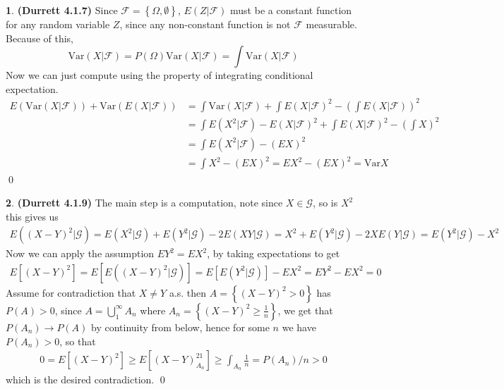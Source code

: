 \documentclass{article}
\theoremstyle{definition}
\newtheorem{pb}{}
\newcommand{\set}[1]{\left\{#1\right\}}
\newcommand{\var}{\text{Var}}
\begin{document}
    \begin{pb}\textbf{(Durrett 4.1.7)}
        Since \(\mathcal{F} = \set{\Omega,\emptyset}\), \(E(Z|\mathcal{F})\) must be a constant function for any random variable \(Z\), since any non-constant function is not \(\mathcal{F}\) measurable. Because of this, \[\var(X|\mathcal{F}) = P(\Omega)\var(X|\mathcal{F}) = \int \var(X|\mathcal{F})\] Now we can just compute using the property of integrating conditional expectation.
        \begin{align*}
            E(\var(X|\mathcal{F})) + \var(E(X|\mathcal{F})) &= \int \var(X|\mathcal{F}) + \int E(X|\mathcal{F})^2 - \left(\int E(X|\mathcal{F})\right)^2 \\
            &= \int E(X^2|\mathcal{F}) - E(X|\mathcal{F})^2 + \int E(X|\mathcal{F})^2 - \left(\int X\right)^2 \\
            &= \int E(X^2|\mathcal{F}) - (EX)^2 \\
            &= \int X^2 - (EX)^2 = EX^2 - (EX)^2 = \var X
        \end{align*} \qed
    \end{pb}
    \begin{pb}\textbf{(Durrett 4.1.9)}
        The main step is a computation, note since \(X\in \mathcal{G}\), so is \(X^2\) this gives us
        \begin{align*}
            E((X-Y)^2|\mathcal{G}) = E(X^2|\mathcal{G}) + E(Y^2|\mathcal{G}) - 2E(XY|\mathcal{G}) = X^2 + E(Y^2|\mathcal{G}) - 2XE(Y|\mathcal{G}) = E(Y^2|\mathcal{G}) - X^2
        \end{align*}
        Now we can apply the assumption \(EY^2 = EX^2\), by taking expectations to get
        \begin{align*}
            E[(X-Y)^2] = E[E((X-Y)^2|\mathcal{G})] = E[E(Y^2|\mathcal{G})] - EX^2 = EY^2 - EX^2 = 0
        \end{align*}
        Assume for contradiction that \(X \neq Y\) a.s. then \(A = \set{(X-Y)^2 > 0}\) has \(P(A) > 0\), since \(A = \bigcup_{1}^\infty A_n\) where \(A_n = \set{(X-Y)^2 \geq \frac{1}{n}}\), we get that \(P(A_n) \to P(A)\) by continuity from below, hence for some \(n\) we have \(P(A_n) > 0\), so that
        \begin{align*}
            0 = E[(X-Y)^2] \geq E[(X-Y)^21_{A_n}] \geq \int_{A_n}\frac{1}{n} = P(A_n)/n > 0
        \end{align*}
        which is the desired contradiction. \qed
    \end{pb}
\end{document}
